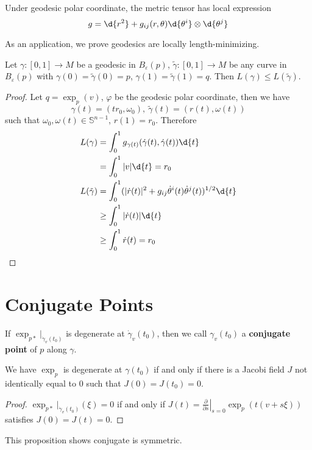 \begin{cor}
    Under geodesic polar coordinate, the metric tensor has local expression
    \[g=\d{r^2}+g_{ij}(r,\theta)\d{\theta^i}\otimes\d{\theta^j}\]
\end{cor}

As an application, we prove geodesics are locally length-minimizing.
\begin{prop}
    Let $\gamma:[0,1]\to M$ be a geodesic in $B_\varepsilon(p)$, $\tilde{\gamma}:[0,1]\to M$ be any curve in $B_\varepsilon(p)$ with $\gamma(0)=\tilde{\gamma}(0)=p$, $\gamma(1)=\tilde{\gamma}(1)=q$.
    Then $L(\gamma)\leq L(\tilde{\gamma})$.
\end{prop}
\begin{proof}
    Let $q=\exp_p(v)$, $\varphi$ be the geodesic polar coordinate, then we have
    \[\gamma(t)=(tr_0,\omega_0),\ \tilde{\gamma}(t)=(r(t),\omega(t))\]
    such that $\omega_0,\omega(t)\in\mathbb{S}^{n-1}$, $r(1)=r_0$.
    Therefore
    \begin{align*}
        L(\gamma)&=\int_0^1g_{\gamma(t)}(\dot{\gamma}(t),\dot{\gamma}(t))\d{t}\\
        &=\int_0^1|v|\d{t}=r_0\\
        L(\tilde{\gamma})&=\int_0^1(|\dot{r}(t)|^2+g_{ij}\dot{\theta}^i(t)\dot{\theta}^j(t))^{1/2}\d{t}\\
        &\geq\int_0^1|\dot{r}(t)|\d{t}\\
        &\geq\int_0^1\dot{r}(t)=r_0\qedhere
    \end{align*}
\end{proof}

\section{Conjugate Points}

\begin{defn}
    If $\exp_{p*}|_{\dot{\gamma}_v(t_0)}$ is degenerate at $\dot{\gamma}_v(t_0)$, then we call $\gamma_v(t_0)$ a \textbf{conjugate point} of $p$ along $\gamma$.
\end{defn}

\begin{prop}
    We have $\exp_p$ is degenerate at $\gamma(t_0)$ if and only if there is a Jacobi field $J$ not identically equal to $0$ such that $J(0)=J(t_0)=0$.
\end{prop}
\begin{proof}
    $\exp_{p*}|_{\dot{\gamma}_v(t_0)}(\xi)=0$ if and only if $J(t)=\left.\frac{\partial{}}{\partial{s}}\right|_{s=0}\exp_p(t(v+s\xi))$ satisfies $J(0)=J(t)=0$.
\end{proof}

\begin{rem}
    This proposition shows conjugate is symmetric.
\end{rem}